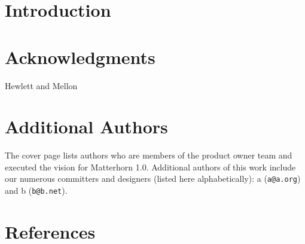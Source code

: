 \documentclass{sig-alternate}
\begin{document}
\section{Introduction}


\section{Acknowledgments}
Hewlett and Mellon



\appendix
\section{Additional Authors}
The cover page lists authors who are members of the product owner team and executed the vision for Matterhorn 1.0.  Additional authors of this work include our numerous committers and designers (listed here alphabetically): a ({\texttt{a@a.org}}) and b ({\texttt{b@b.net}}).

\section{References}
\end{document}
